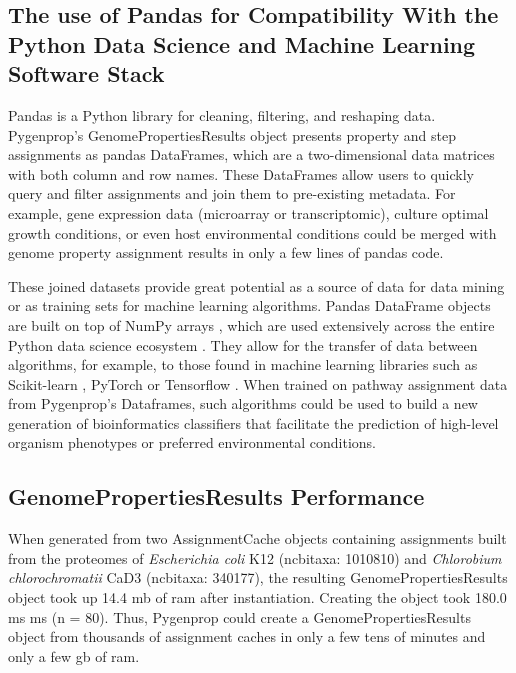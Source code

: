 \subsection{The use of Pandas for Compatibility With the Python Data Science and Machine Learning Software Stack}

Pandas is a Python library for cleaning, filtering, and reshaping data. Pygenprop's GenomePropertiesResults object presents property and step assignments as pandas DataFrames, which are a two-dimensional data matrices with both column and row names. These DataFrames allow users to quickly query and filter assignments and join them to pre-existing metadata. For example, gene expression data (microarray or transcriptomic), culture optimal growth conditions, or even host environmental conditions could be merged with genome property assignment results in only a few lines of pandas code.

These joined datasets provide great potential as a source of data for data mining or as training sets for machine learning algorithms. Pandas DataFrame objects are built on top of NumPy arrays \cite{mckinney2010data}, which are used extensively across the entire Python data science ecosystem \cite{scipystack}. They allow for the transfer of data between algorithms, for example, to those found in machine learning libraries such as Scikit-learn \cite{pedregosa2011scikit}, PyTorch \cite{Paszke2017} or Tensorflow \cite{abadi2016tensorflow}.  When trained on pathway assignment data from Pygenprop's Dataframes, such algorithms could be used to build a new generation of bioinformatics classifiers that facilitate the prediction of high-level organism phenotypes or preferred environmental conditions.

\subsection{GenomePropertiesResults Performance}

When generated from two AssignmentCache objects containing assignments built from the proteomes of \textit{Escherichia coli} K12 (\gls{ncbitaxa}: 1010810) and \textit{Chlorobium chlorochromatii} CaD3 (\gls{ncbitaxa}: 340177), the resulting GenomePropertiesResults object took up 14.4 \gls{mb} of \gls{ram} after instantiation. Creating the object took 180.0 ms  ms (\gls{n} = 80). Thus, Pygenprop could create a GenomePropertiesResults object from thousands of assignment caches in only a few tens of minutes and only a few \gls{gb}  of \gls{ram}. 

